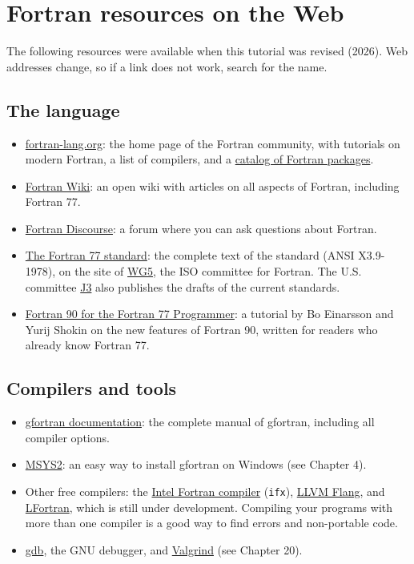 \chapter{Fortran resources on the Web}

The following resources were available when this tutorial was revised (2026). Web addresses change, so if a link does not work, search for the name.

\section{The language}

\begin{itemize}
    \item \href{https://fortran-lang.org}{fortran-lang.org}: the home page of the Fortran community, with tutorials on modern Fortran, a list of compilers, and a \href{https://fortran-lang.org/packages/}{catalog of Fortran packages}.
    \item \href{https://fortranwiki.org}{Fortran Wiki}: an open wiki with articles on all aspects of Fortran, including Fortran 77.
    \item \href{https://fortran-lang.discourse.group}{Fortran Discourse}: a forum where you can ask questions about Fortran.
    \item \href{https://wg5-fortran.org/ARCHIVE/Fortran77.html}{The Fortran 77 standard}: the complete text of the standard (ANSI X3.9-1978), on the site of \href{https://wg5-fortran.org}{WG5}, the ISO committee for Fortran. The U.S. committee \href{https://j3-fortran.org}{J3} also publishes the drafts of the current standards.
    \item \href{https://www.nsc.liu.se/~boein/f77to90/f77to90.html}{Fortran 90 for the Fortran 77 Programmer}: a tutorial by Bo Einarsson and Yurij Shokin on the new features of Fortran 90, written for readers who already know Fortran 77.
\end{itemize}

\section{Compilers and tools}

\begin{itemize}
    \item \href{https://gcc.gnu.org/onlinedocs/gfortran/}{gfortran documentation}: the complete manual of gfortran, including all compiler options.
    \item \href{https://www.msys2.org}{MSYS2}: an easy way to install gfortran on Windows (see Chapter 4).
    \item Other free compilers: the \href{https://www.intel.com/content/www/us/en/developer/tools/oneapi/fortran-compiler.html}{Intel Fortran compiler} (\texttt{ifx}), \href{https://flang.llvm.org}{LLVM Flang}, and \href{https://lfortran.org}{LFortran}, which is still under development. Compiling your programs with more than one compiler is a good way to find errors and non-portable code.
    \item \href{https://www.gnu.org/software/gdb/}{gdb}, the GNU debugger, and \href{https://valgrind.org}{Valgrind} (see Chapter 20).
\end{itemize}

